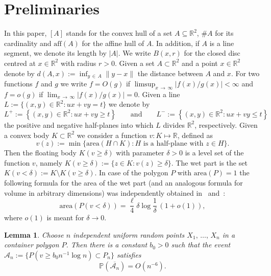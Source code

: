 \documentclass[10pt]{amsart}
\newtheorem{lemm}[theo]{Lemma}\newtheorem{prop}[theo]{Proposition}\newtheorem{coro}[theo]{Corollary}\newtheorem{conj}[theo]{Conjecture}
\theoremstyle{definition}\newtheorem{defi}[theo]{Definition}\newtheorem{rema}[theo]{Remark}\newtheorem{exam}[theo]{Example}\newtheorem{exem}[theo]{Example}\newtheorem{nota}[theo]{Notation}
\newcommand{\bbR}{\mathbb{R}}
\newcommand{\bbP}{\mathbb{P}}
\newcommand{\clA}{\mathcal{A}}
\newcommand{\area}{\mathrm{area}}
\newcommand{\aff}{\mathrm{aff}}
\begin{document}
\section{Preliminaries}\label{sec:Prelim}

In this paper, $[A]$ stands for the convex hull of a set $A\subseteq\bbR^2$, $\# A$ for its cardinality and $\aff(A)$ for the affine hull of $A$. In addition, if $A$ is a line segment, we denote its length by $|A|$. We write $B(x,r)$ for the closed disc centred at $x\in\bbR^2$ with radius $r>0$. Given a set $A\subset \bbR^2$ and a point $x\in\bbR^2$ denote by $d(A,x):=\inf_{y\,\in\,A}\|y-x\|$ the distance between $A$ and $x$. For two functions $f$ and $g$ we write $f=O(g)$ if $\limsup_{x\,\to\,\infty}|f(x)/g(x)|<\infty$ and $f=o(g)$ if $\lim_{x\,\to\,\infty}|f(x)/g(x)|=0$. Given a line $L:=\{(x,y)\in\bbR^2\colon ux+vy=t\}$ we denote by
\[
L^+:= \left\{(x,y)\in\bbR^2\colon ux+vy\ge t\right\}\qquad \text{and}\qquad L^-:= \left\{(x,y)\in\bbR^2\colon ux+vy\leq t\right\}
\]
the positive and negative half-planes into which $L$ divides $\bbR^2$, respectively. Given a convex body $K\subset\bbR^2$ we consider a function $v:K\mapsto\bbR$, defined as
\[
v(z):=\min\{{\area}(H\cap K)\colon H\text{ is a half-plane with }z\in H\}.
\]
Then the floating body $K(v\ge \delta)$ with parameter $\delta>0$ is a level set of the function $v$, namely $K(v\ge \delta):=\{z\in K\colon v(z)\ge \delta\}$. The wet part is the set $K(v<\delta):=K\setminus K(v\ge \delta)$. In case of the polygon $P$ with ${\area}(P)=1$ the following formula for the area of the wet part (and an analogous formula for volume in arbitrary dimensions) was independently obtained in~\cite{Schu91} and~\cite{BB93}:
\begin{equation}\label{eq:wetpart}
{\area}(P(v<\delta))=\frac{\ell}{4}\delta \log \frac 1{\delta}\, (1+o(1)),
\end{equation}
where $o(1)$ is meant for $\delta\to 0$.

\begin{lemm}\label{le:floating-Pn}
Choose $n$ independent uniform random points $X_1,\,\dots,\,X_n$ in a container polygon $P$. Then there is a constant $b_0>0$ such that the event $\clA_n := \{ P(v\ge b_0 n^{-1} \log n)\subset P_{n}\}$ satisfies
\begin{equation}
\bbP(\overline{\clA_n}) =O(n^{-6}).
\end{equation}
\end{lemm}
\end{document}
